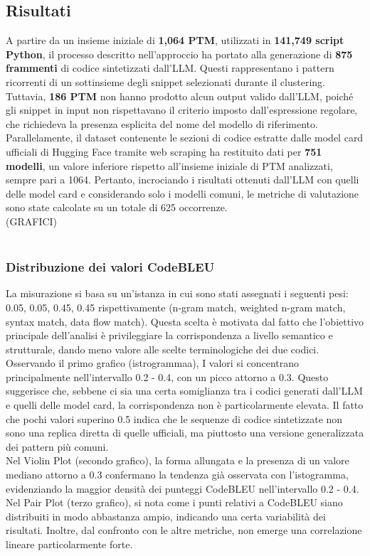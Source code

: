 \documentclass{article}
\begin{document}
\subsection{Risultati}
A partire da un insieme iniziale di \textbf{1,064 PTM}, utilizzati in \textbf{141,749 script Python}, il processo descritto nell’approccio ha portato alla generazione di \textbf{875 frammenti} di codice sintetizzati dall’LLM. Questi rappresentano i pattern ricorrenti di un sottinsieme degli snippet selezionati durante il clustering. Tuttavia, \textbf{186 PTM} non hanno prodotto alcun output valido dall’LLM, poiché gli snippet in input non rispettavano il criterio imposto dall’espressione regolare, che richiedeva la presenza esplicita del nome del modello di riferimento.\\
Parallelamente, il dataset contenente le sezioni di codice estratte dalle model card ufficiali di Hugging Face tramite web scraping ha restituito dati per \textbf{751 modelli}, un valore inferiore rispetto all'insieme iniziale di PTM analizzati, sempre pari a 1064. Pertanto, incrociando i risultati ottenuti dall’LLM con quelli delle model card e considerando solo i modelli comuni, le metriche di valutazione sono state calcolate su un totale di 625 occorrenze.\\
(GRAFICI)\\
\\

\subsubsection{Distribuzione dei valori CodeBLEU}
La misurazione si basa su un'istanza in cui sono stati assegnati i seguenti pesi: 0.05, 0.05, 0.45, 0.45 rispettivamente (n-gram match, weighted n-gram match, syntax match, data flow match). Questa scelta è motivata dal fatto che l’obiettivo principale dell’analisi è privileggiare la corrispondenza a livello semantico e strutturale, dando meno valore alle scelte terminologiche dei due codici.\\
Osservando il primo grafico (istrogrammaa), I valori si concentrano principalmente nell’intervallo 0.2 - 0.4, con un picco attorno a 0.3. Questo suggerisce che, sebbene ci sia una certa somiglianza tra i codici generati dall’LLM e quelli delle model card, la corrispondenza non è particolarmente elevata. Il fatto che pochi valori superino 0.5 indica che le sequenze di codice sintetizzate non sono una replica diretta di quelle ufficiali, ma piuttosto una versione generalizzata dei pattern più comuni.\\
Nel Violin Plot (secondo grafico), la forma allungata e la presenza di un valore mediano attorno a 0.3 confermano la tendenza già osservata con l’istogramma, evidenziando la maggior densità dei punteggi CodeBLEU nell’intervallo 0.2 - 0.4. Nel Pair Plot (terzo grafico), si nota come i punti relativi a CodeBLEU siano distribuiti in modo abbastanza ampio, indicando una certa variabilità dei risultati. Inoltre, dal confronto con le altre metriche, non emerge una correlazione lineare particolarmente forte.
\end{document}
